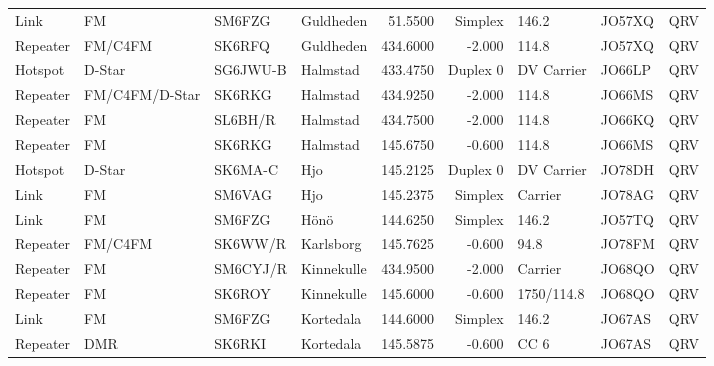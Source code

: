 \begin{landscape}
\begin{longtable}{llllrrlll}
	Link              & FM              & SM6FZG   & Guldheden             &      51.5500 &    Simplex & 146.2             & JO57XQ      & QRV      \\
	Repeater          & FM/C4FM         & SK6RFQ   & Guldheden             &     434.6000 &     -2.000 & 114.8             & JO57XQ      & QRV      \\
	Hotspot           & D-Star          & SG6JWU-B & Halmstad              &     433.4750 &   Duplex 0 & DV Carrier        & JO66LP      & QRV      \\
	Repeater          & FM/C4FM/D-Star  & SK6RKG   & Halmstad              &     434.9250 &     -2.000 & 114.8             & JO66MS      & QRV      \\
	Repeater          & FM              & SL6BH/R  & Halmstad              &     434.7500 &     -2.000 & 114.8             & JO66KQ      & QRV      \\
	Repeater          & FM              & SK6RKG   & Halmstad              &     145.6750 &     -0.600 & 114.8             & JO66MS      & QRV      \\
	Hotspot           & D-Star          & SK6MA-C  & Hjo                   &     145.2125 &   Duplex 0 & DV Carrier        & JO78DH      & QRV      \\
	Link              & FM              & SM6VAG   & Hjo                   &     145.2375 &    Simplex & Carrier           & JO78AG      & QRV      \\
	Link              & FM              & SM6FZG   & Hönö                  &     144.6250 &    Simplex & 146.2             & JO57TQ      & QRV      \\
	Repeater          & FM/C4FM         & SK6WW/R  & Karlsborg             &     145.7625 &     -0.600 & 94.8              & JO78FM      & QRV      \\
	Repeater          & FM              & SM6CYJ/R & Kinnekulle            &     434.9500 &     -2.000 & Carrier           & JO68QO      & QRV      \\
	Repeater          & FM              & SK6ROY   & Kinnekulle            &     145.6000 &     -0.600 & 1750/114.8        & JO68QO      & QRV      \\
	Link              & FM              & SM6FZG   & Kortedala             &     144.6000 &    Simplex & 146.2             & JO67AS      & QRV      \\
	Repeater          & DMR             & SK6RKI   & Kortedala             &     145.5875 &     -0.600 & CC 6              & JO67AS      & QRV      \\

\end{longtable}
\end{landscape}
